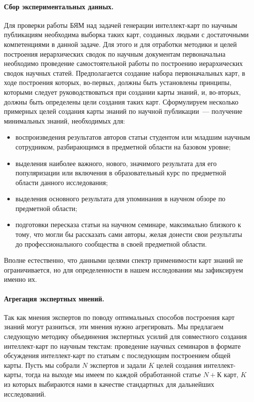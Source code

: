 \documentclass[12pt]{article}
\begin{document}
\paragraph{Сбор экспериментальных данных.} Для проверки работы БЯМ над задачей генерации интеллект-карт по научным публикациям необходима выборка таких карт, созданных людьми с достаточными компетенциями в данной задаче. Для этого и для отработки методики и целей построения иерархических сводок по научным документам первоначальна необходимо проведение самостоятельной работы по построению иерархических сводок научных статей. Предполагается создание набора первоначальных карт, в ходе построения которых, во-первых, должны быть установлены принципы, которыми следует руководствоваться при создании карты знаний, и, во-вторых, должны быть определены цели создания таких карт. Сформулируем несколько примерных целей создания карты знаний по научной публикации~--- получение минимальных знаний, необходимых для:
\begin{itemize}
\item воспроизведения результатов авторов статьи студентом или младшим научным сотрудником, разбирающимся в предметной области на базовом уровне;
\item выделения наиболее важного, нового, значимого результата для его популяризации или включения в образовательный курс по предметной области данного исследования;
\item выделения основного результата для упоминания в научном обзоре по предметной области;
\item подготовки пересказа статьи на научном семинаре, максимально близкого к тому, что могли бы рассказать сами авторы, желая донести свои результаты до профессионального сообщества в своей предметной области. 
\end{itemize}
Вполне естественно, что данными целями спектр применимости карт знаний не ограничивается, но для определенности в нашем исследовании мы зафиксируем именно их.

\paragraph{Агрегация экспертных мнений.} Так как мнения экспертов по поводу оптимальных способов построения карт знаний могут разниться, эти мнения нужно агрегировать. Мы предлагаем следующую методику объединения экспертных усилий для совместного создания интеллект-карт по научным текстам: проведение научных семинаров в формате обсуждения интеллект-карт по статьям с последующим построением общей карты. Пусть мы собрали $N$ экспертов и задали $K$ целей создания интеллект-карты, тогда на выходе мы имеем по каждой обработанной статье $N+К$ карт, $K$ из которых выбираются нами в качестве стандартных для дальнейших исследований.
\end{document}
